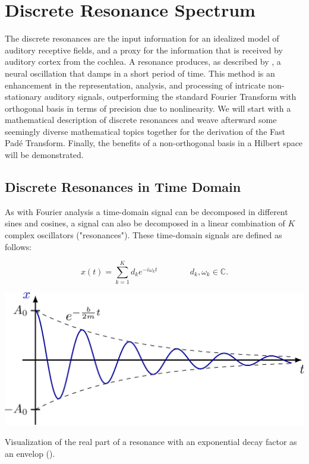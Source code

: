 
\chapter{Discrete Resonance Spectrum}
\label{chap:resonances}
The discrete resonances are the input information for an idealized model of auditory receptive fields, and a proxy for the information that is received by auditory cortex from the cochlea. A resonance produces, as described by \textcite{homer_modelling_2023}, a neural oscillation that damps in a short period of time. This method is an enhancement in the representation, analysis, and processing of intricate non-stationary auditory signals, outperforming the standard Fourier Transform with orthogonal basis in terms of precision due to nonlinearity. We will start with a mathematical description of discrete resonances and weave afterward some seemingly diverse mathematical topics together for the derivation of the Fast Padé Transform. Finally, the benefits of a non-orthogonal basis in a Hilbert space will be demonstrated.


\section{Discrete Resonances in Time Domain}

As with Fourier analysis a time-domain signal can be decomposed in different sines and cosines, a signal can also be decomposed in a linear combination of $K$ complex oscillators ("resonances"). 
These time-domain signals are defined as follows:

\begin{equation}
    x(t) = \sum^K_{k=1} d_ke^{-i\omega_kt} 
    \; \; \; \; \; \; \; \; \; \; \; \; \; \; 
    d_k, \omega_k \in \mathbb{C} .
\end{equation}

\begin{marginfigure}
\centering
\includegraphics[width=0.9\linewidth]{images/resonances/dynamics_oscillator.png}
\caption{Visualization of the real part of a resonance with an exponential decay factor as an envelop (\cite{neutelings_harmonic_2021}).}
\label{dampedHarmonic} \vspace{3cm}
\end{marginfigure}

